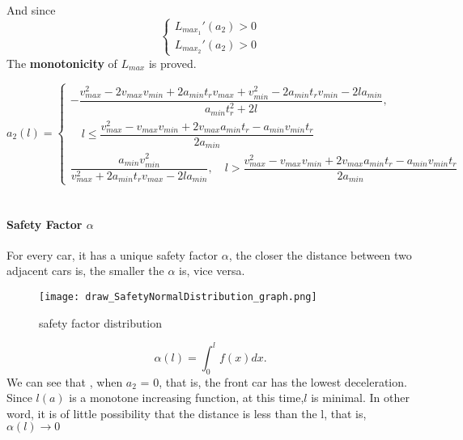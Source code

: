 And since 
\begin{equation}
\left \{
\begin{array}{cl}
L_{max_1}'(a_2) > 0 \\
L_{max_2}'(a_2) > 0
\end{array}
\right .
\end{equation}
The \textbf{monotonicity} of $ L_{max} $ is proved.

\[ a_2(l) = \begin{cases}
-\dfrac{v_{max}^2 - 2v_{max}v_{min} + 2a_{min}t_rv_{max} + v_{min}^2 - 2a_{min}t_rv_{min} - 2la_{min}}{a_{min}t_r^2 + 2l}, 
\\

\quad l \leq \dfrac{v_{max}^2 - v_{max}v_{min} + 2v_{max}a_{min}t_r - a_{min} v_{min}t_r}{2a_{min}}\\
\dfrac{a_{min}v_{min}^2}{v_{max}^2 + 2a_{min}t_rv_{max} - 2la_{min}}, \quad  l > \dfrac{v_{max}^2 - v_{max}v_{min} + 2v_{max}a_{min}t_r - a_{min} v_{min}t_r}{2a_{min}}
\end{cases}\]
\\

\paragraph{Safety Factor $\alpha$}
For every car, it has a unique safety factor $\alpha$, the 
closer the distance between two adjacent cars is, the smaller 
the $\alpha$ is, vice versa.\\

\begin{figure}[h]
\small
\centering
\texttt{[image: draw\_SafetyNormalDistribution\_graph.png]}
\caption{safety factor distribution} \label{fig: safety factor distribution}
\end{figure}
\begin{displaymath}
\alpha(l) = \int_{0}^{l} f(x) dx.
\end{displaymath}
We can see that , when $a_2$ = 0, that is, the front car 
has the lowest deceleration. Since $l(a)$ is a monotone 
increasing function, at this time,$l$ is minimal. In other 
word, it is of little possibility that the distance is less 
than the l, that is, $\alpha(l) \rightarrow 0$                     



